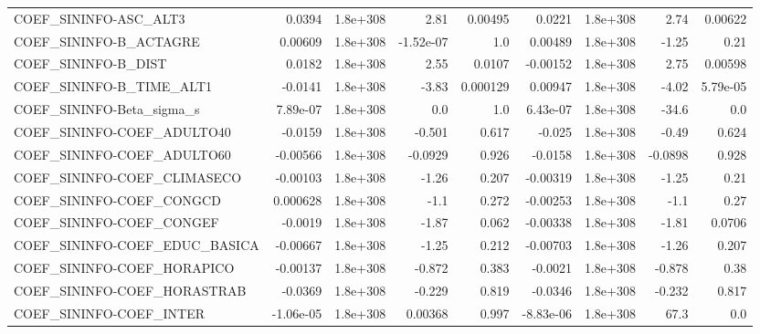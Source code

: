 \begin{tabular}{lrrrrrrrr}
COEF\_SININFO-ASC\_ALT3             &      0.0394 &     1.8e+308 &      2.81 &  0.00495 &     0.0221 &    1.8e+308 &         2.74 &       0.00622 \\
COEF\_SININFO-B\_ACTAGRE            &     0.00609 &     1.8e+308 & -1.52e-07 &      1.0 &    0.00489 &    1.8e+308 &        -1.25 &          0.21 \\
COEF\_SININFO-B\_DIST               &      0.0182 &     1.8e+308 &      2.55 &   0.0107 &   -0.00152 &    1.8e+308 &         2.75 &       0.00598 \\
COEF\_SININFO-B\_TIME\_ALT1          &     -0.0141 &     1.8e+308 &     -3.83 & 0.000129 &    0.00947 &    1.8e+308 &        -4.02 &      5.79e-05 \\
COEF\_SININFO-Beta\_sigma\_s         &    7.89e-07 &     1.8e+308 &       0.0 &      1.0 &   6.43e-07 &    1.8e+308 &        -34.6 &           0.0 \\
COEF\_SININFO-COEF\_ADULTO40        &     -0.0159 &     1.8e+308 &    -0.501 &    0.617 &     -0.025 &    1.8e+308 &        -0.49 &         0.624 \\
COEF\_SININFO-COEF\_ADULTO60        &    -0.00566 &     1.8e+308 &   -0.0929 &    0.926 &    -0.0158 &    1.8e+308 &      -0.0898 &         0.928 \\
COEF\_SININFO-COEF\_CLIMASECO       &    -0.00103 &     1.8e+308 &     -1.26 &    0.207 &   -0.00319 &    1.8e+308 &        -1.25 &          0.21 \\
COEF\_SININFO-COEF\_CONGCD          &    0.000628 &     1.8e+308 &      -1.1 &    0.272 &   -0.00253 &    1.8e+308 &         -1.1 &          0.27 \\
COEF\_SININFO-COEF\_CONGEF          &     -0.0019 &     1.8e+308 &     -1.87 &    0.062 &   -0.00338 &    1.8e+308 &        -1.81 &        0.0706 \\
COEF\_SININFO-COEF\_EDUC\_BASICA     &    -0.00667 &     1.8e+308 &     -1.25 &    0.212 &   -0.00703 &    1.8e+308 &        -1.26 &         0.207 \\
COEF\_SININFO-COEF\_HORAPICO        &    -0.00137 &     1.8e+308 &    -0.872 &    0.383 &    -0.0021 &    1.8e+308 &       -0.878 &          0.38 \\
COEF\_SININFO-COEF\_HORASTRAB       &     -0.0369 &     1.8e+308 &    -0.229 &    0.819 &    -0.0346 &    1.8e+308 &       -0.232 &         0.817 \\
COEF\_SININFO-COEF\_INTER           &   -1.06e-05 &     1.8e+308 &   0.00368 &    0.997 &  -8.83e-06 &    1.8e+308 &         67.3 &           0.0 \\

\end{tabular}
